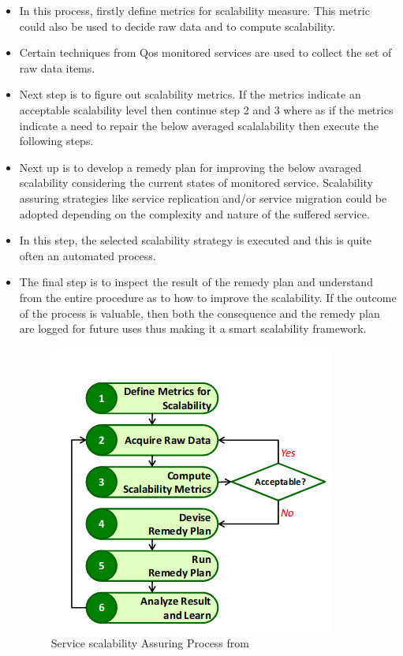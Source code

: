 \begin{itemize}
	

\item In this process, firstly define metrics for scalability measure. This metric could also be used to decide raw data and to compute scalability. 

\item Certain techniques from Qos monitored services are used to collect the set of raw data items. 

\item Next step is to figure out scalability metrics. If the metrics indicate an acceptable scalability level then continue step 2 and 3 where as if the metrics indicate a need to repair the below averaged scalalability then execute the following steps. 


\item Next up is to develop a remedy plan for improving the below avaraged scalability considering the current states of monitored service. Scalability assuring strategies like service replication and/or service migration could be adopted depending on the complexity and nature of the suffered service. 


\item In this step, the selected scalability strategy is executed and this is quite often an automated process. 

\item The final step is to inspect the result of the remedy plan and understand from the entire procedure as to how to improve the scalability. If the outcome of the process is valuable, then both the consequence and the remedy plan are logged for future uses thus making it a smart scalability framework.

\begin{figure}[h]
	\centering
	\includegraphics[width=0.7\linewidth]{figures/ServiceScalability}
	\caption{Service scalability Assuring Process from \cite{lee_software_2010}}
	\label{fig:servicescalability}
\end{figure}

\end{itemize}
\newpage

